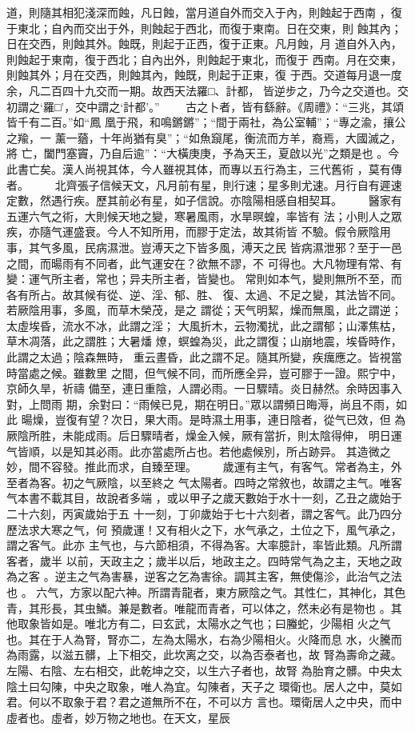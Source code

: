 \documentclass{ctexart}
\begin{document}
道，則隨其相犯淺深而蝕，凡日蝕，當月道自外而交入于內，則蝕起于西南 ，復于東北；自內而交出于外，則蝕起于西北，而復于東南。日在交東，則 蝕其內；日在交西，則蝕其外。蝕既，則起于正西，復于正東。凡月蝕，月 道自外入內，則蝕起于東南，復于西北；自內出外，則蝕起于東北，而復于 西南。月在交東，則蝕其外；月在交西，則蝕其內，蝕既，則起于正東，復 于西。交道每月退一度余，凡二百四十九交而一期。故西天法羅□、計都， 皆逆步之，乃今之交道也。交初謂之`羅□'，交中謂之`計都'。'' 　　古之卜者，皆有繇辭。《周禮》：``三兆，其頌皆千有二百。''如``鳳 凰于飛，和鳴鏘鏘''；``間于兩社，為公室輔''；``專之渝，攘公之羭，一 薰一蕕，十年尚猶有臭''；``如魚竀尾，衡流而方羊，裔焉，大國滅之，將 亡，闔門塞竇，乃自后逾''：``大橫庚庚，予為天王，夏啟以光''之類是也 。今此書亡矣。漢人尚視其体，今人雖視其体，而專以五行為主，三代舊術 ，莫有傳者。 　　北齊張子信候天文，凡月前有星，則行速；星多則尤速。月行自有遲速 定數，然遇行疾。歷其前必有星，如子信說。亦陰陽相感自相契耳。 　　醫家有五運六气之術，大則候天地之變，寒暑風雨，水旱暝蝗，率皆有 法；小則人之眾疾，亦隨气運盛衰。今人不知所用，而膠于定法，故其術皆 不驗。假令厥陰用事，其气多風，民病濕泄。豈溥天之下皆多風，溥天之民 皆病濕泄邪？至于一邑之間，而暘雨有不同者，此气運安在？欲無不謬，不 可得也。大凡物理有常、有變：運气所主者，常也；异夫所主者，皆變也。 常則如本气，變則無所不至，而各有所占。故其候有從、逆、淫、郁、胜、 復、太過、不足之變，其法皆不同。若厥陰用事，多風，而草木榮茂，是之 謂從；天气明絜，燥而無風，此之謂逆；太虛埃昏，流水不冰，此謂之淫； 大風折木，云物濁扰，此之謂郁；山澤焦枯，草木凋落，此之謂胜；大暑燔 燎，螟蝗為災，此之謂復；山崩地震，埃昏時作，此謂之太過；陰森無時， 重云晝昏，此之謂不足。隨其所變，疾癘應之。皆視當時當處之候。雖數里 之間，但气候不同，而所應全异，豈可膠于一證。熙宁中，京師久旱，祈禱 備至，連日重陰，人謂必雨。一日驟晴。炎日赫然。余時因事入對，上問雨 期，余對曰：``雨候已見，期在明日。''眾以謂頻日晦溽，尚且不雨，如此 暘燥，豈復有望？次日，果大雨。是時濕土用事，連日陰者，從气已效，但 為厥陰所胜，未能成雨。后日驟晴者，燥金入候，厥有當折，則太陰得伸， 明日運气皆順，以是知其必雨。此亦當處所占也。若他處候別，所占跡异。 其造微之妙，間不容發。推此而求，自臻至理。 　　歲運有主气，有客气。常者為主，外至者為客。初之气厥陰，以至終之 气太陽者。四時之常敘也，故謂之主气。唯客气本書不載其目，故說者多端 ，或以甲子之歲天數始于水十一刻，乙丑之歲始于二十六刻，丙寅歲始于五 十一刻，丁卯歲始于七十六刻者，謂之客气。此乃四分歷法求大寒之气，何 預歲運！又有相火之下，水气承之，土位之下，風气承之，謂之客气。此亦 主气也，与六節相須，不得為客。大率臆計，率皆此類。凡所謂客者，歲半 以前，天政主之；歲半以后，地政主之。四時常气為之主，天地之政為之客 。逆主之气為害暴，逆客之乞為害徐。調其主客，無使傷沴，此治气之法也 。 六气，方家以配六神。所謂青龍者，東方厥陰之气。其性仁，其神化，其色 青，其形長，其虫鱗。兼是數者。唯龍而青者，可以体之，然未必有是物也 。其他取象皆如是。唯北方有二，曰玄武，太陽水之气也；曰螣蛇，少陽相 火之气也。其在于人為腎，腎亦二，左為太陽水，右為少陽相火。火降而息 水，火騰而為雨露，以滋五髒，上下相交，此坎离之交，以為否泰者也，故 腎為壽命之藏。左陽、右陰、左右相交，此乾坤之交，以生六子者也，故腎 為胎育之髒。中央太陰土曰勾陳，中央之取象，唯人為宜。勾陳者，天子之 環衛也。居人之中，莫如君。何以不取象于君？君之道無所不在，不可以方 言也。環衛居人之中央，而中虛者也。虛者，妙万物之地也。在天文，星辰 
\end{document}
